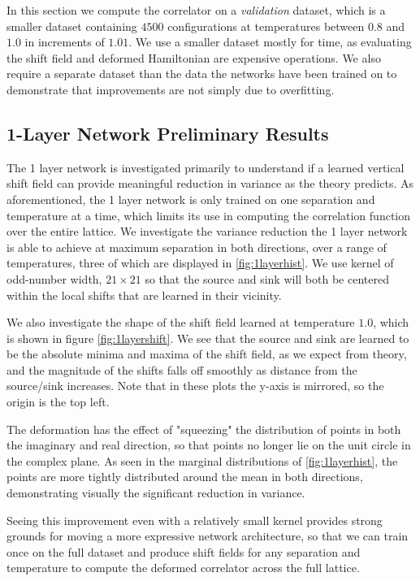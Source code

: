 \documentclass[12pt]{article}
\begin{document}
In this section we compute the correlator on a \textit{validation} dataset, which is a smaller dataset containing $4500$ configurations at temperatures
between $0.8$ and $1.0$ in increments of $1.01$. We use a smaller dataset mostly for time, as evaluating the shift field and deformed Hamiltonian are expensive
operations. We also require a separate dataset than the data the networks have been trained on to demonstrate that improvements are not simply due to overfitting.

\subsection{1-Layer Network Preliminary Results}

The 1 layer network is investigated primarily to understand if a learned vertical shift field can provide meaningful reduction in variance as the theory predicts.
As aforementioned, the 1 layer network is only trained on one separation and temperature at a time, which limits its use in computing the correlation function
over the entire lattice. We investigate the variance reduction the 1 layer network is able to achieve at maximum separation in both directions, over a range of temperatures,
three of which are displayed in \ref{fig:1layerhist}. We use kernel of odd-number width, $21\times21$ so that the source and sink will both be centered 
within the local shifts that are learned in their vicinity. 

We also investigate the shape of the shift field learned at temperature $1.0$, which is shown in figure \ref{fig:1layershift}. We see that the source and sink
are learned to be the absolute minima and maxima of the shift field, as we expect from theory, and the magnitude of the shifts falls off smoothly
as distance from the source/sink increases. Note that in these plots the y-axis is mirrored, so the origin is the top left.

The deformation has the effect of "squeezing" the distribution of points in both the imaginary and real direction, so that points no longer lie on the unit 
circle in the complex plane. As seen in the marginal distributions of \ref{fig:1layerhist}, the points are more tightly distributed around the mean in 
both directions, demonstrating visually the significant reduction in variance.

Seeing this improvement even with a relatively small kernel provides strong grounds for moving a more expressive network architecture, so that we can train once
on the full dataset and produce shift fields for any separation and temperature to compute the deformed correlator across the full lattice.
\end{document}
